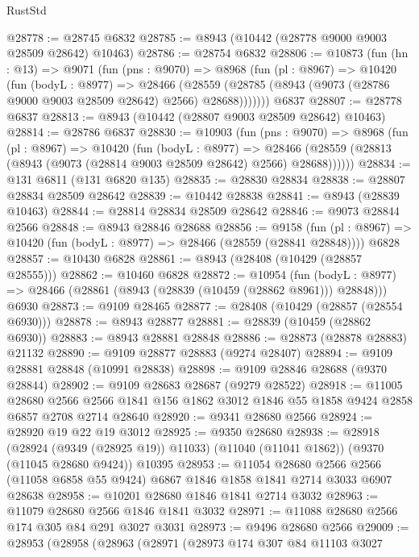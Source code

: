 \begin{lexlean}{RustStd}
\begin{coremodule}
@28778 := @28745 @6832
@28785 := @8943 (@10442 (@28778 @9000 @9003 @28509 @28642) @10463)
@28786 := @28754 @6832
@28806 := @10873
    (fun (hn : @13) =>
    @9071
      (fun (pns : @9070) =>
      @8968
        (fun (pl : @8967) =>
        @10420
          (fun (bodyL : @8977) =>
          @28466
            (@28559 (@28785 (@8943 (@9073 (@28786 @9000 @9003 @28509 @28642) @2566) @28688)))))))
    @6837
@28807 := @28778 @6837
@28813 := @8943 (@10442 (@28807 @9003 @28509 @28642) @10463)
@28814 := @28786 @6837
@28830 := @10903
    (fun (pns : @9070) =>
    @8968
      (fun (pl : @8967) =>
      @10420
        (fun (bodyL : @8977) =>
        @28466 (@28559 (@28813 (@8943 (@9073 (@28814 @9003 @28509 @28642) @2566) @28688))))))
@28834 := @131 @6811 (@131 @6820 @135)
@28835 := @28830 @28834
@28838 := @28807 @28834 @28509 @28642
@28839 := @10442 @28838
@28841 := @8943 (@28839 @10463)
@28844 := @28814 @28834 @28509 @28642
@28846 := @9073 @28844 @2566
@28848 := @8943 @28846 @28688
@28856 := @9158
    (fun (pl : @8967) => @10420 (fun (bodyL : @8977) => @28466 (@28559 (@28841 @28848))))
    @6828
@28857 := @10430 @6828
@28861 := @8943 (@28408 (@10429 (@28857 @28555)))
@28862 := @10460 @6828
@28872 := @10954
    (fun (bodyL : @8977) => @28466 (@28861 (@8943 (@28839 (@10459 (@28862 @8961))) @28848)))
    @6930
@28873 := @9109 @28465
@28877 := @28408 (@10429 (@28857 (@28554 @6930)))
@28878 := @8943 @28877
@28881 := @28839 (@10459 (@28862 @6930))
@28883 := @8943 @28881 @28848
@28886 := @28873 (@28878 @28883) @21132
@28890 := @9109 @28877 @28883 (@9274 @28407)
@28894 := @9109 @28881 @28848 (@10991 @28838)
@28898 := @9109 @28846 @28688 (@9370 @28844)
@28902 := @9109 @28683 @28687 (@9279 @28522)
@28918 := @11005
    @28680
    @2566
    @2566
    @1841
    @156
    @1862
    @3012
    @1846
    @55
    @1858
    @9424
    @2858
    @6857
    @2708
    @2714
    @28640
@28920 := @9341 @28680 @2566
@28924 := @28920 @19 @22 @19 @3012
@28925 := @9350 @28680
@28938 := @28918
    (@28924 (@9349 (@28925 @19)) @11033)
    (@11040 (@11041 @1862))
    (@9370 (@11045 @28680 @9424))
    @10395
@28953 := @11054
    @28680
    @2566
    @2566
    (@11058 @6858 @55 @9424)
    @6867
    @1846
    @1858
    @1841
    @2714
    @3033
    @6907
    @28638
@28958 := @10201 @28680 @1846 @1841 @2714 @3032
@28963 := @11079 @28680 @2566 @1846 @1841 @3032
@28971 := @11088 @28680 @2566 @174 @305 @84 @291 @3027 @3031
@28973 := @9496 @28680 @2566
@29009 := @28953
    (@28958
      (@28963
        (@28971
          (@28973
            @174
            @307
            @84
            @11103
            @3027

\end{coremodule}
\end{lexlean}
